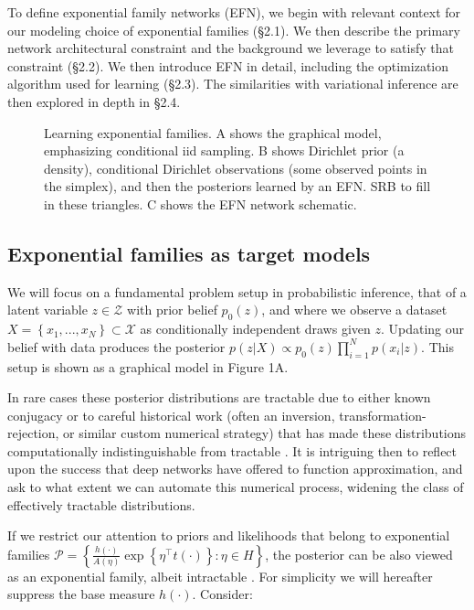 \documentclass{article}
\begin{document}
 To define exponential family networks (EFN), we begin with relevant context for our modeling choice of exponential families (\S2.1).  We then describe the primary network architectural constraint and the background we leverage to satisfy that constraint (\S2.2). We then introduce EFN in detail, including the optimization algorithm used for learning (\S2.3).  The similarities with variational inference are then explored in depth in \S2.4.
  
\begin{figure}
\centering

  \caption{Learning exponential families.  A shows the graphical model, emphasizing conditional iid sampling.  B shows Dirichlet prior (a density), conditional Dirichlet observations (some observed points in the simplex), and then the posteriors learned by an EFN.  SRB to fill in these triangles.   C shows the EFN network schematic.}
\end{figure}

 \subsection{Exponential families as target models}

We will focus on a fundamental problem setup in probabilistic inference, that of a latent variable $z \in \mathcal{Z}$ with prior belief $p_0(z)$, and where we observe a dataset $X = \left\{x_1,...,x_N\right\} \subset \mathcal{X}$ as conditionally independent draws given $z$.   Updating our belief with data produces the posterior $p(z | X) \propto p_0(z) \prod_{i=1}^N p(x_i | z)$.  This setup is shown as a graphical model in Figure 1A.

In rare cases these posterior distributions are tractable due to either known conjugacy or to careful historical work (often an inversion, transformation-rejection, or similar custom numerical strategy) that has made these distributions computationally indistinguishable from tractable \cite{Devroye:1986aa}.  It is intriguing then to reflect upon the success that deep networks have offered to function approximation, and ask to what extent we can automate this numerical process, widening the class of effectively tractable distributions.

If we restrict our attention to priors and likelihoods that belong to exponential families $\mathcal{P} = \left\{ \frac{h(\cdot)}{A(\eta)} \exp\left\{ \eta^\top t(\cdot) \right \} : \eta \in H \right\}$, the posterior can be also viewed as an exponential family, albeit intractable \cite{wainwright2008graphical}.  For simplicity we will hereafter suppress the base measure $h(\cdot)$.  Consider:
\end{document}
